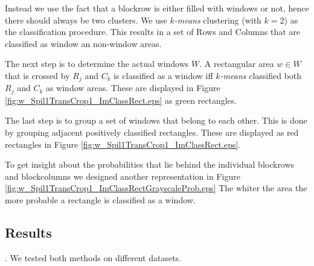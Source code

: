 Instead we use the fact that a blockrow is either filled with windows or not, hence
there should always be two clusters.  We use \emph{$k$-means} clustering (with
$k=2$) as the classification procedure.
This results in a set of Rows and Columns that are classified as window an
non-window areas.

The next step is to determine the actual windows $W$.
A rectangular area $w\in W$ that is crossed by $R_j$ and $C_k$ is classified as a
window iff \emph{$k$-means} classified both $R_j$ and $C_k$ as window areas. These are displayed in 
 Figure \ref{fig:w_Spil1TransCrop1_ImClassRect.eps} as green rectangles.

The last step is to group a set of windows that belong to each other. This is done by 
grouping adjacent positively classified rectangles. These are displayed as red
rectangles in Figure \ref{fig:w_Spil1TransCrop1_ImClassRect.eps}.


To get insight about the probabilities that lie behind the individual blockrows and blockcolumns
we designed another representation in Figure \ref{fig:w_Spil1TransCrop1_ImClassRectGrayscaleProb.eps}
The whiter the area the more probable a rectangle is classified as a window.



\subsection{Results}
\label{sec:results}.
We tested both methods on different datasets.

\newpage
{}


